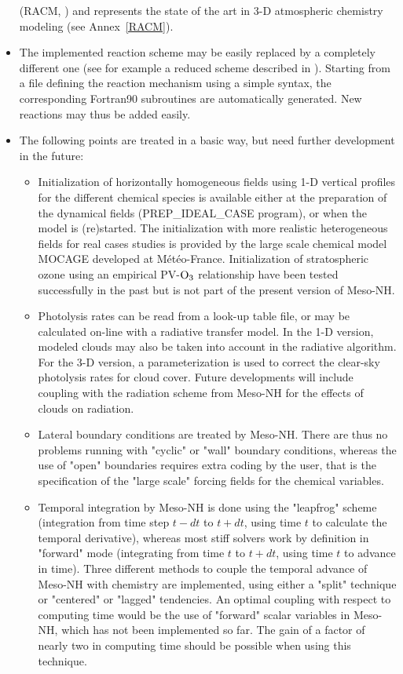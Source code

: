 \begin{itemize}
      (RACM, \citet{Stockwell1997})
      and represents the state of the art in 3-D atmospheric chemistry
      modeling  (see Annex~\ref{RACM}).
\item The implemented reaction scheme may be easily replaced by a
      completely different one (see for example a reduced scheme described
      in \citet{Crassier2003}).
      Starting from a file defining the reaction mechanism
      using a simple syntax, the corresponding Fortran90 subroutines
      are automatically generated. New reactions may thus be added easily.
\item The following points are treated in a basic way,
      but need further development in the future:
  \begin{itemize}
    \item Initialization of horizontally homogeneous fields using 1-D vertical 
        profiles for the different chemical species is available
        either at the preparation of the dynamical fields
        (PREP\_IDEAL\_CASE program), or when the model is (re)started.
        The initialization with more realistic heterogeneous fields 
        for real cases studies is provided by 
        the large scale chemical model MOCAGE developed at M\'et\'eo-France.
        Initialization of stratospheric ozone using an empirical
        PV-$\rm O_3$ relationship have been tested successfully in
        the past but is not part of the present version of Meso-NH.
    \item Photolysis rates can be read from a look-up table file,
        or may be calculated on-line with a radiative transfer model.
        In the 1-D version, modeled clouds may also be taken into
        account in the radiative algorithm. For the 3-D version, a 
        parameterization is used to correct the clear-sky photolysis rates for
        cloud cover. Future developments will include 
        coupling with the radiation scheme from Meso-NH for the effects of
        clouds on radiation.
    \item Lateral boundary conditions are treated by Meso-NH.
        There are thus no problems
        running with "cyclic" or "wall" boundary conditions, whereas
        the use of "open" boundaries requires extra coding by the user,
        that is the specification of the "large scale" forcing fields
        for the chemical variables.
    \item Temporal integration by Meso-NH is done using the "leapfrog" scheme
        (integration from time step $t-dt$ to $t+dt$, using time $t$
        to calculate the temporal derivative),
        whereas most stiff solvers work by definition in "forward" mode
        (integrating from time $t$ to $t+dt$,
        using time $t$ to advance in time).
        Three different methods to couple the temporal advance of
        Meso-NH with chemistry are implemented, using either a "split"
        technique or "centered" or "lagged" tendencies.
        An optimal coupling with respect to computing time would be
        the use of "forward" scalar variables in Meso-NH, which has not been
        implemented so far. The gain of a factor of nearly
        two in computing time should be possible when using this technique.
  \end{itemize}
\end{itemize}
